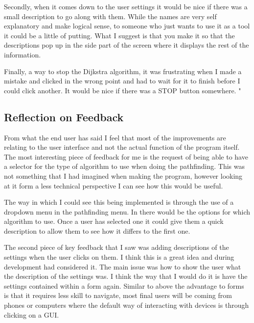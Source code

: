 \begin{flushleft}
\begin{enumerate}
        Secondly, when it comes down to the user settings it would be nice if there was a small description to go along with them. While the names are very self explanatory and make logical sense, to someone who just wants to use it as a tool it could be a little of putting. What I suggest is that you make it so that the descriptions pop up in the side part of the screen where it displays the rest of the information.  \\ \bk

        Finally, a way to stop the Dijkstra algorithm, it was frustrating when I made a mistake and clicked in the wrong point and had to wait for it to finish before I could click another. It would be nice if there was a STOP button somewhere.        "
    \end{enumerate}
    \BK

    \subsection{Reflection on Feedback}
    From what the end user has said I feel that most of the improvements are relating to the user interface and not the actual function of the program itself. The most interesting piece of feedback for me is the request of being able to have a selector for the type of algorithm to use when doing the pathfinding. This was not something that I had imagined when making the program, however looking at it form a less technical perspective I can see how this would be useful. \\ \bk

    The way in which I could see this being implemented is through the use of a dropdown menu in the pathfinding menu. In there would be the options for which algorithm to use. Once a user has selected one it could give them a quick description to allow them to see how it differs to the first one. \\ \bk

    The second piece of key feedback that I saw was adding descriptions of the settings when the user clicks on them. I think this is a great idea and during development had considered it. The main issue was how to show the user what the description of the settings was. I think the way that I would do it is have the settings contained within a form again. Similar to above the advantage to forms is that it requires less skill to navigate, most final users will be coming from phones or computers where the default way of interacting with devices is through clicking on a GUI. \\ \bk


\end{flushleft}
